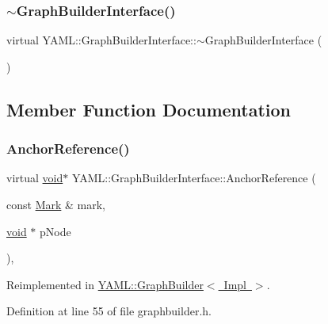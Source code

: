 \subsubsection{\texorpdfstring{$\sim$GraphBuilderInterface()}{~GraphBuilderInterface()}}
{\footnotesize\ttfamily virtual Y\+A\+M\+L\+::\+Graph\+Builder\+Interface\+::$\sim$\+Graph\+Builder\+Interface (\begin{DoxyParamCaption}{ }\end{DoxyParamCaption})\hspace{0.3cm}{\ttfamily [pure virtual]}}



\subsection{Member Function Documentation}
\mbox{\label{class_y_a_m_l_1_1_graph_builder_interface_ab742307ea6e415387e21265ea311c4b0}} 
\subsubsection{\texorpdfstring{AnchorReference()}{AnchorReference()}}
{\footnotesize\ttfamily virtual \mbox{\hyperlink{glad_8h_a950fc91edb4504f62f1c577bf4727c29}{void}}$\ast$ Y\+A\+M\+L\+::\+Graph\+Builder\+Interface\+::\+Anchor\+Reference (\begin{DoxyParamCaption}\item[{const \mbox{\hyperlink{struct_y_a_m_l_1_1_mark}{Mark}} \&}]{mark,  }\item[{\mbox{\hyperlink{glad_8h_a950fc91edb4504f62f1c577bf4727c29}{void}} $\ast$}]{p\+Node }\end{DoxyParamCaption})\hspace{0.3cm}{\ttfamily [inline]}, {\ttfamily [virtual]}}



Reimplemented in \mbox{\hyperlink{class_y_a_m_l_1_1_graph_builder_a64e7ef2c78f86a1eb93d5d6fd5e560ea}{Y\+A\+M\+L\+::\+Graph\+Builder$<$ Impl $>$}}.



Definition at line 55 of file graphbuilder.\+h.

\mbox{\label{class_y_a_m_l_1_1_graph_builder_interface_ad33488cc66061b8dc506377d26912cf7}} 
